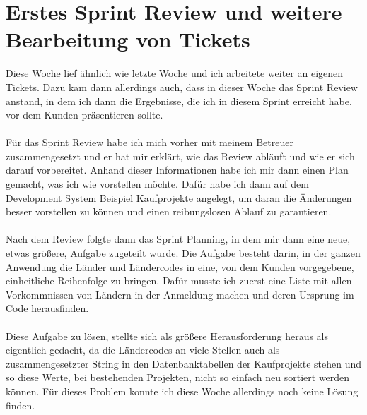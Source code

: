 \section{Erstes Sprint Review und weitere Bearbeitung von Tickets}
Diese Woche lief ähnlich wie letzte Woche und ich arbeitete weiter an eigenen Tickets. Dazu kam dann allerdings auch, dass in dieser Woche das Sprint Review anstand, in dem ich dann die Ergebnisse, die ich in diesem Sprint erreicht habe, vor dem Kunden präsentieren sollte. \\\\
Für das Sprint Review habe ich mich vorher mit meinem Betreuer zusammengesetzt und er hat mir erklärt, wie das Review abläuft und wie er sich darauf vorbereitet. Anhand dieser Informationen habe ich mir dann einen Plan gemacht, was ich wie vorstellen möchte. Dafür habe ich dann auf dem Development System Beispiel Kaufprojekte angelegt, um daran die Änderungen besser vorstellen zu können und einen reibungslosen Ablauf zu garantieren. \\\\
Nach dem Review folgte dann das Sprint Planning, in dem mir dann eine neue, etwas größere, Aufgabe zugeteilt wurde. Die Aufgabe besteht darin, in der ganzen Anwendung die Länder und Ländercodes in eine, von dem Kunden vorgegebene, einheitliche Reihenfolge zu bringen. Dafür musste ich zuerst eine Liste mit allen Vorkommnissen von Ländern in der Anmeldung machen und deren Ursprung im Code herausfinden. \\\\
Diese Aufgabe zu lösen, stellte sich als größere Herausforderung heraus als eigentlich gedacht, da die Ländercodes an viele Stellen auch als zusammengesetzter String in den Datenbanktabellen der Kaufprojekte stehen und so diese Werte, bei bestehenden Projekten, nicht so einfach neu sortiert werden können. Für dieses Problem konnte ich diese Woche allerdings noch keine Lösung finden. \\\\

